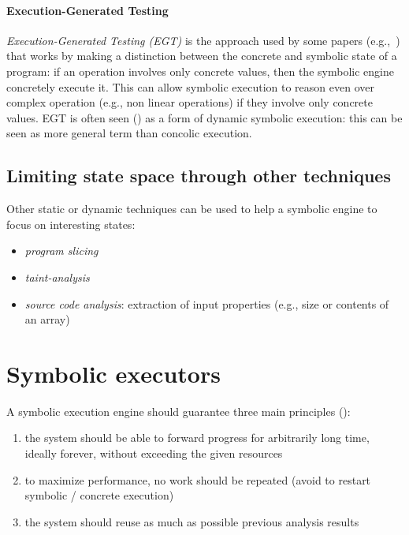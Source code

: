 \paragraph{Execution-Generated Testing} {\em Execution-Generated Testing (EGT)} is the approach used by some papers (e.g.,~\cite{KLEE-OSDI08,EXE-CCS06}) that works by making a distinction between the concrete and symbolic state of a program: if an operation involves only concrete values, then the symbolic engine concretely execute it. This can allow symbolic execution to reason even over complex operation (e.g., non linear operations) if they involve only concrete values. EGT is often seen (\cite{CS-CACM13}) as a form of dynamic symbolic execution: this can be seen as more general term than concolic execution.

\subsection{Limiting state space through other techniques}

Other static or dynamic techniques can be used to help a symbolic engine to focus on interesting states:
\begin{itemize}
  \item {\em program slicing}
  \item {\em taint-analysis}
  \item {\em source code analysis}: extraction of input properties (e.g., size or contents of an array)
\end{itemize}

\section{Symbolic executors}
A symbolic execution engine should guarantee three main principles (\cite{MAYHEM-SP12}):
\begin{enumerate}
  \item the system should be able to forward progress for arbitrarily long time, ideally forever, without exceeding the given resources
  \item to maximize performance, no work should be repeated (avoid to restart symbolic / concrete execution)
  \item the system should reuse as much as possible previous analysis results
\end{enumerate}

